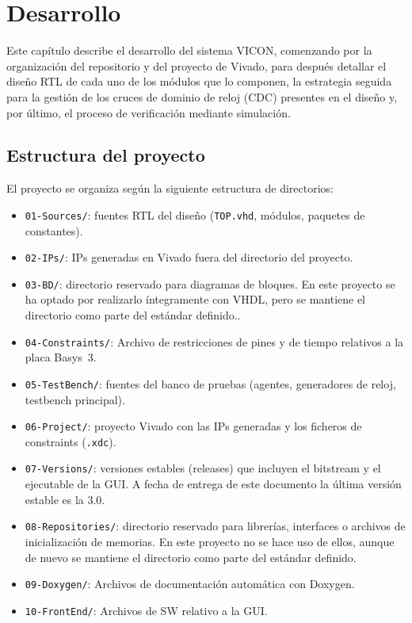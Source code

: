 \documentclass[../main.tex]{subfiles}
\begin{document}
\chapter{Desarrollo}
\label{chap:desarrollo}

Este capítulo describe el desarrollo del sistema \ac{VICON}, comenzando por la organización del repositorio y del proyecto de Vivado, para después detallar el diseño \ac{RTL} de cada uno de los módulos que lo componen, la estrategia seguida para la gestión de los cruces de dominio de reloj (\ac{CDC}) presentes en el diseño y, por último, el proceso de verificación mediante simulación.

\section{Estructura del proyecto}

El proyecto se organiza según la siguiente estructura de directorios:

\begin{itemize}
    \item \texttt{01-Sources/}: fuentes \ac{RTL} del diseño (\texttt{TOP.vhd}, módulos, paquetes de constantes).
    \item \texttt{02-IPs/}: \ac{IP}s generadas en Vivado fuera del directorio del proyecto.
    \item \texttt{03-BD/}: directorio reservado para diagramas de bloques. En este proyecto se ha optado por realizarlo íntegramente con \ac{VHDL}, pero se mantiene el directorio como parte del estándar definido..
    \item \texttt{04-Constraints/}: Archivo de restricciones de pines y de tiempo relativos a la placa Basys~3.
    \item \texttt{05-TestBench/}: fuentes del banco de pruebas (agentes, generadores de reloj, testbench principal).
    \item \texttt{06-Project/}: proyecto Vivado con las \ac{IP}s generadas y los ficheros de constraints (\texttt{.xdc}).
    \item \texttt{07-Versions/}: versiones estables (releases) que incluyen el bitstream y el ejecutable de la \ac{GUI}. A fecha de entrega de este documento la última versión estable es la 3.0.
    \item \texttt{08-Repositories/}: directorio reservado para librerías, interfaces o archivos de inicialización de memorias. En este proyecto no se hace uso de ellos, aunque de nuevo se mantiene el directorio como parte del estándar definido.
    \item \texttt{09-Doxygen/}: Archivos de documentación automática con Doxygen.
    \item \texttt{10-FrontEnd/}: Archivos de \ac{SW} relativo a la \ac{GUI}.
\end{itemize}
\end{document}
